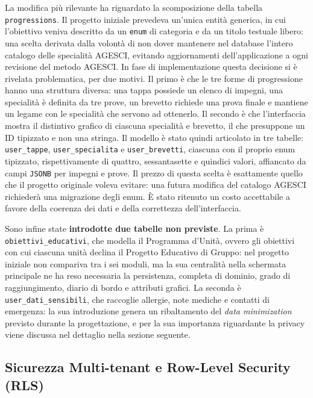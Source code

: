 \documentclass[11pt]{article}
\numberwithin{figure}{section}
\begin{document}
La modifica più rilevante ha riguardato la scomposizione della tabella \texttt{progressions}. Il progetto iniziale prevedeva un'unica entità generica, in cui l'obiettivo veniva descritto da un \texttt{enum} di categoria e da un titolo testuale libero: una scelta derivata dalla volontà di non dover mantenere nel database l'intero catalogo delle specialità AGESCI, evitando aggiornamenti dell'applicazione a ogni revisione del metodo AGESCI. In fase di implementazione questa decisione si è rivelata problematica, per due motivi. Il primo è che le tre forme di progressione hanno una struttura diversa: una tappa possiede un elenco di impegni, una specialità è definita da tre prove, un brevetto richiede una prova finale e mantiene un legame con le specialità che servono ad ottenerlo. Il secondo è che l'interfaccia mostra il distintivo grafico di ciascuna specialità e brevetto, il che presuppone un ID tipizzato e non una stringa. Il modello è stato quindi articolato in tre tabelle: \texttt{user\_tappe}, \texttt{user\_specialita} e \texttt{user\_brevetti}, ciascuna con il proprio enum tipizzato, rispettivamente di quattro, sessantasette e quindici valori, affiancato da campi \texttt{JSONB} per impegni e prove. Il prezzo di questa scelta è esattamente quello che il progetto originale voleva evitare: una futura modifica del catalogo AGESCI richiederà una migrazione degli enum. È stato ritenuto un costo accettabile a favore della coerenza dei dati e della correttezza dell'interfaccia.

Sono infine state \textbf{introdotte due tabelle non previste}. La prima è \texttt{obiettivi\_educativi}, che modella il Programma d'Unità, ovvero gli obiettivi con cui ciascuna unità declina il Progetto Educativo di Gruppo: nel progetto iniziale non compariva tra i sei moduli, ma la sua centralità nella schermata principale ne ha reso necessaria la persistenza, completa di dominio, grado di raggiungimento, diario di bordo e attributi grafici. La seconda è \texttt{user\_dati\_sensibili}, che raccoglie allergie, note mediche e contatti di emergenza: la sua introduzione genera un ribaltamento del \textit{data minimization} previsto durante la progettazione, e per la sua importanza riguardante la privacy viene discussa nel dettaglio nella sezione seguente.

\subsection{Sicurezza Multi-tenant e Row-Level Security (RLS)}
\end{document}
